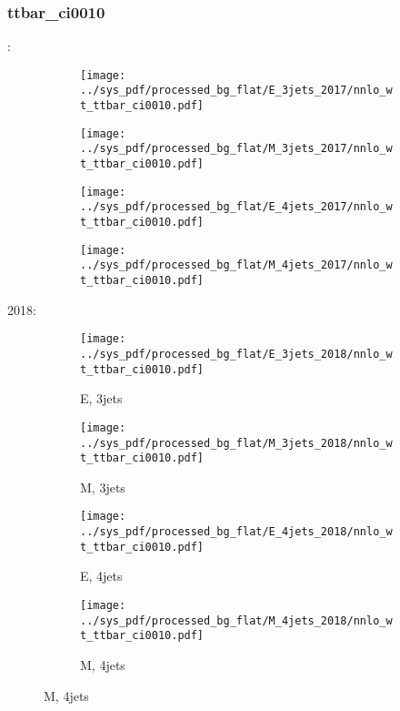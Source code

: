 \documentclass{beamer}
\begin{document}
\begin{frame}
\frametitle{ttbar_ci0010}
\fontsize{5}{1}:
\begin{figure}
\centering
\begin{subfigure}[b]{0.24\textwidth}
\texttt{[image: ../sys\_pdf/processed\_bg\_flat/E\_3jets\_2017/nnlo\_wt\_ttbar\_ci0010.pdf]}
\end{subfigure}
\begin{subfigure}[b]{0.24\textwidth}
\texttt{[image: ../sys\_pdf/processed\_bg\_flat/M\_3jets\_2017/nnlo\_wt\_ttbar\_ci0010.pdf]}
\end{subfigure}
\begin{subfigure}[b]{0.24\textwidth}
\texttt{[image: ../sys\_pdf/processed\_bg\_flat/E\_4jets\_2017/nnlo\_wt\_ttbar\_ci0010.pdf]}
\end{subfigure}
\begin{subfigure}[b]{0.24\textwidth}
\texttt{[image: ../sys\_pdf/processed\_bg\_flat/M\_4jets\_2017/nnlo\_wt\_ttbar\_ci0010.pdf]}
\end{subfigure}
\end{figure}
2018:
\begin{figure}
\centering
\begin{subfigure}[b]{0.24\textwidth}
\texttt{[image: ../sys\_pdf/processed\_bg\_flat/E\_3jets\_2018/nnlo\_wt\_ttbar\_ci0010.pdf]}
\captionsetup{font=tiny}
\caption{E, 3jets}
\end{subfigure}
\begin{subfigure}[b]{0.24\textwidth}
\texttt{[image: ../sys\_pdf/processed\_bg\_flat/M\_3jets\_2018/nnlo\_wt\_ttbar\_ci0010.pdf]}
\captionsetup{font=tiny}
\caption{M, 3jets}
\end{subfigure}
\begin{subfigure}[b]{0.24\textwidth}
\texttt{[image: ../sys\_pdf/processed\_bg\_flat/E\_4jets\_2018/nnlo\_wt\_ttbar\_ci0010.pdf]}
\captionsetup{font=tiny}
\caption{E, 4jets}
\end{subfigure}
\begin{subfigure}[b]{0.24\textwidth}
\texttt{[image: ../sys\_pdf/processed\_bg\_flat/M\_4jets\_2018/nnlo\_wt\_ttbar\_ci0010.pdf]}
\captionsetup{font=tiny}
\caption{M, 4jets}
\end{subfigure}
\end{figure}
\end{frame}
\end{document}
